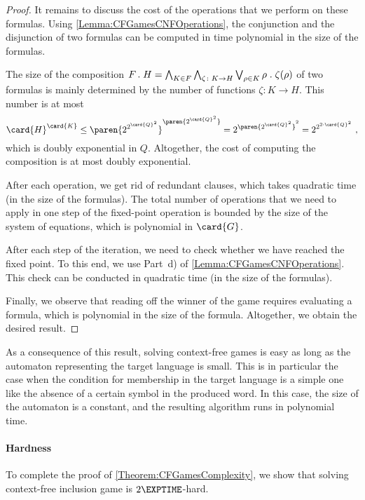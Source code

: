 \documentclass[../../diss.tex]{subfiles}
\begin{document}
\begin{proof}
    It remains to discuss the cost of the operations that we perform on these formulas.
    Using \cref{Lemma:CFGamesCNFOperations}, the conjunction and the disjunction of two formulas can be computed in time polynomial in the size of the formulas.

    The size of the composition $F \comp H = \bigwedge_{K \in F} \bigwedge_{\zeta \colon K \to H} \bigvee_{\tbox \in K } \tbox \comp \zeta(\tbox)$
    of two formulas is mainly determined by the number of functions $\zeta \colon K \to H$.
    This number is at most
    \[
        \card{H}^{\card{K}}
        \leq {\paren{2^{2^{\card{Q}^2}}}}^{\paren{2^{\card{Q}^2}}}
        = 2^{ \paren{2^{\card{Q}^2}}^2}
        = 2^{ {2^{2 \cdot \card{Q}^2}}}
        \ ,
    \]
    which is doubly exponential in $Q$.
    Altogether, the cost of computing the composition is at most doubly exponential.

    After each operation, we get rid of redundant clauses, which takes quadratic time (in the size of the formulas).
    The total number of operations that we need to apply in one step of the fixed-point operation is bounded by the size of the system of equations, which is polynomial in $\card{G}$.

    After each step of the iteration, we need to check whether we have reached the fixed point.
    To this end, we use Part~d) of \cref{Lemma:CFGamesCNFOperations}.
    This check can be conducted in quadratic time (in the size of the formulas).

    Finally, we observe that reading off the winner of the game requires evaluating a formula, which is polynomial in the size of the formula.
    Altogether, we obtain the desired result.
\end{proof}

As a consequence of this result, solving context-free games is easy as long as the automaton representing the target language is small.
This is in particular the case when the condition for membership in the target language is a simple one like the absence of a certain symbol in the produced word.
In this case, the size of the automaton is a constant, and the resulting algorithm runs in polynomial time.


\paragraph{Hardness}

To complete the proof of \cref{Theorem:CFGamesComplexity}, we show that solving context-free inclusion game is $2\EXPTIME$-hard.
\end{document}
